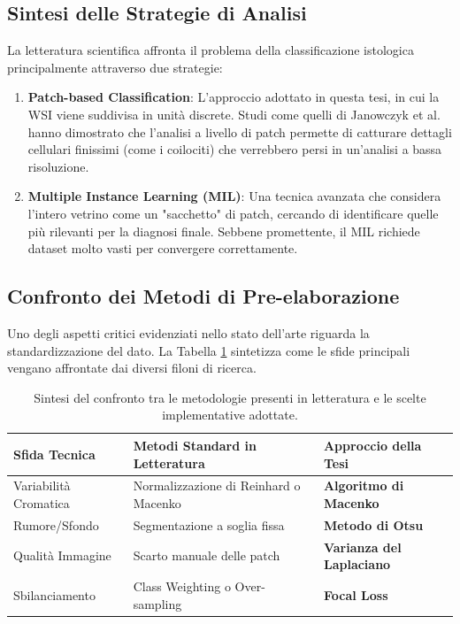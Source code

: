 \subsection{Sintesi delle Strategie di Analisi}
La letteratura scientifica affronta il problema della classificazione istologica principalmente attraverso due strategie:
\begin{enumerate}
    \item \textbf{Patch-based Classification}: L'approccio adottato in questa tesi, in cui la WSI viene suddivisa in unità discrete. Studi come quelli di Janowczyk et al. \cite{janowczyk2016deep} hanno dimostrato che l'analisi a livello di patch permette di catturare dettagli cellulari finissimi (come i coilociti) che verrebbero persi in un'analisi a bassa risoluzione.
    \item \textbf{Multiple Instance Learning (MIL)}: Una tecnica avanzata che considera l'intero vetrino come un "sacchetto" di patch, cercando di identificare quelle più rilevanti per la diagnosi finale. Sebbene promettente, il MIL richiede dataset molto vasti per convergere correttamente.
\end{enumerate}

\subsection{Confronto dei Metodi di Pre-elaborazione}
Uno degli aspetti critici evidenziati nello stato dell'arte riguarda la standardizzazione del dato. La Tabella \ref{tab:stato_arte} sintetizza come le sfide principali vengano affrontate dai diversi filoni di ricerca.

\begin{table}[htbp]
    \centering
    \small %
    \renewcommand{\arraystretch}{1.5} %
    \begin{tabular*}{\textwidth}{@{\extracolsep{\fill}} l l l @{}}
        \toprule
        \textbf{Sfida Tecnica} & \textbf{Metodi Standard in Letteratura} & \textbf{Approccio della Tesi} \\
        \midrule
        Variabilità Cromatica & Normalizzazione di Reinhard o Macenko & \textbf{Algoritmo di Macenko} \\
        Rumore/Sfondo         & Segmentazione a soglia fissa           & \textbf{Metodo di Otsu} \\
        Qualità Immagine      & Scarto manuale delle patch             & \textbf{Varianza del Laplaciano} \\
        Sbilanciamento        & Class Weighting o Over-sampling        & \textbf{Focal Loss} \\
        \bottomrule
    \end{tabular*}
    \caption{Sintesi del confronto tra le metodologie presenti in letteratura e le scelte implementative adottate.}
    \label{tab:stato_arte}
\end{table}


